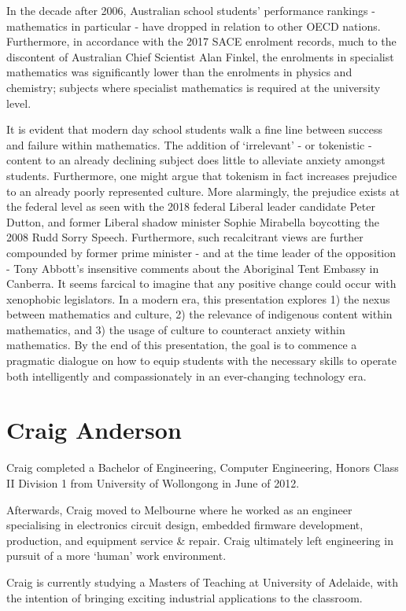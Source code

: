 \documentclass[twoside,14pt,a4paper,notitlepage]{memoir}
\begin{document}
In the decade after 2006, Australian school students’ performance rankings - mathematics in particular - have dropped in relation to other OECD nations. Furthermore, in accordance with the 2017 SACE enrolment records, much to the discontent of Australian Chief Scientist Alan Finkel, the enrolments in specialist mathematics was significantly lower than the enrolments in physics and chemistry; subjects where specialist mathematics is required at the university level.

It is evident that modern day school students walk a fine line between success and failure within mathematics. The addition of ‘irrelevant’ - or tokenistic - content to an already declining subject does little to alleviate anxiety amongst students. Furthermore, one might argue that tokenism in fact increases prejudice to an already poorly represented culture.
More alarmingly, the prejudice exists at the federal level as seen with the 2018 federal Liberal leader candidate Peter Dutton, and former Liberal shadow minister Sophie Mirabella boycotting the 2008 Rudd Sorry Speech. Furthermore, such recalcitrant views are further compounded by former prime minister - and at the time leader of the opposition - Tony Abbott’s insensitive comments about the Aboriginal Tent Embassy in Canberra. It seems farcical to imagine that any positive change could occur with xenophobic legislators.
In a modern era, this presentation explores 1) the nexus between mathematics and culture, 2) the relevance of indigenous content within mathematics, and 3) the usage of culture to counteract anxiety within mathematics. By the end of this presentation, the goal is to commence a pragmatic dialogue on how to equip students with the necessary skills to operate both intelligently and compassionately in an ever-changing technology era.

\section*{Craig Anderson}

Craig completed a Bachelor of Engineering, Computer Engineering, Honors Class II Division 1 from University of Wollongong in June of 2012.

Afterwards, Craig moved to Melbourne where he worked as an engineer specialising in electronics circuit design, embedded firmware development, production, and equipment service \& repair. Craig ultimately left engineering in pursuit of a more ‘human’ work environment.

Craig is currently studying a Masters of Teaching at University of Adelaide, with the intention of bringing exciting industrial applications to the classroom.
\end{document}
